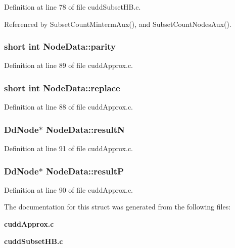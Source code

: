 Definition at line 78 of file cudd\-Subset\-HB.c.

Referenced by Subset\-Count\-Minterm\-Aux(), and Subset\-Count\-Nodes\-Aux().
\subsubsection{\setlength{\rightskip}{0pt plus 5cm}short int \bf{Node\-Data::parity}}\label{structNodeData_39c013ecaf2a1a8ee39eed228fdbae31}




Definition at line 89 of file cudd\-Approx.c.
\subsubsection{\setlength{\rightskip}{0pt plus 5cm}short int \bf{Node\-Data::replace}}\label{structNodeData_8f3bf3f6f5825dfcad311a7bd4fe40ca}




Definition at line 88 of file cudd\-Approx.c.
\subsubsection{\setlength{\rightskip}{0pt plus 5cm}\bf{Dd\-Node}$\ast$ \bf{Node\-Data::result\-N}}\label{structNodeData_c7a372bb8869d56bfd5be035f1595860}




Definition at line 91 of file cudd\-Approx.c.
\subsubsection{\setlength{\rightskip}{0pt plus 5cm}\bf{Dd\-Node}$\ast$ \bf{Node\-Data::result\-P}}\label{structNodeData_16a29f336bc083eac6e2023c5bc399f8}




Definition at line 90 of file cudd\-Approx.c.

The documentation for this struct was generated from the following files:\begin{CompactItemize}
\item 
\bf{cudd\-Approx.c}\item 
\bf{cudd\-Subset\-HB.c}\end{CompactItemize}
